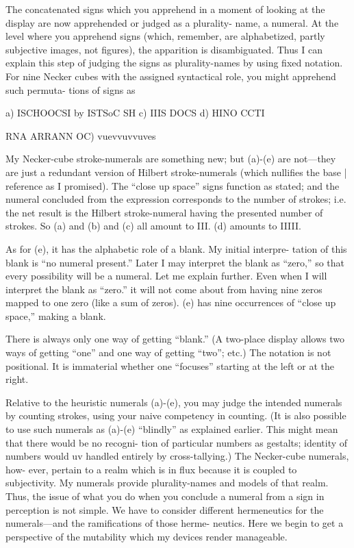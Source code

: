 The concatenated signs which you apprehend in a moment of 
looking at the display are now apprehended or judged as a plurality- 
name, a numeral. At the level where you apprehend signs (which, 
remember, are alphabetized, partly subjective images, not figures), the 
apparition is disambiguated. Thus I can explain this step of judging the 
signs as plurality-names by using fixed notation. For nine Necker cubes 
with the assigned syntactical role, you might apprehend such permuta- 
tions of signs as 


a) ISCHOOCSI 
by ISTSoC SH 
c) IIIS DOCS 
d) HINO CCTI 


RNA ARRANN 
OC) vuevvuvvuves 


My Necker-cube stroke-numerals are something new; but (a)-(e) are 
not—they are just a redundant version of Hilbert stroke-numerals 
(which nullifies the base | reference as I promised). The “close up 
space” signs function as stated; and the numeral concluded from the 
expression corresponds to the number of strokes; i.e. the net result is 
the Hilbert stroke-numeral having the presented number of strokes. So 
(a) and (b) and (c) all amount to III. (d) amounts to IIIII. 

As for (e), it has the alphabetic role of a blank. My initial interpre- 
tation of this blank is “no numeral present.” Later I may interpret the 
blank as “zero,” so that every possibility will be a numeral. Let me 
explain further. Even when I will interpret the blank as “zero.” it will 
not come about from having nine zeros mapped to one zero (like a sum 
of zeros). (e) has nine occurrences of “close up space,” making a blank. 


There is always only one way of getting “blank.” (A two-place display 
allows two ways of getting “one” and one way of getting “two”; etc.) 
The notation is not positional. It is immaterial whether one “focuses” 
starting at the left or at the right. 

Relative to the heuristic numerals (a)-(e), you may judge the 
intended numerals by counting strokes, using your naive competency 
in counting. (It is also possible to use such numerals as (a)-(e) “blindly” 
as explained earlier. This might mean that there would be no recogni- 
tion of particular numbers as gestalts; identity of numbers would uv 
handled entirely by cross-tallying.) The Necker-cube numerals, how- 
ever, pertain to a realm which is in flux because it is coupled to 
subjectivity. My numerals provide plurality-names and models of that 
realm. Thus, the issue of what you do when you conclude a numeral 
from a sign in perception is not simple. We have to consider different 
hermeneutics for the numerals—and the ramifications of those herme- 
neutics. Here we begin to get a perspective of the mutability which my 
devices render manageable. 

